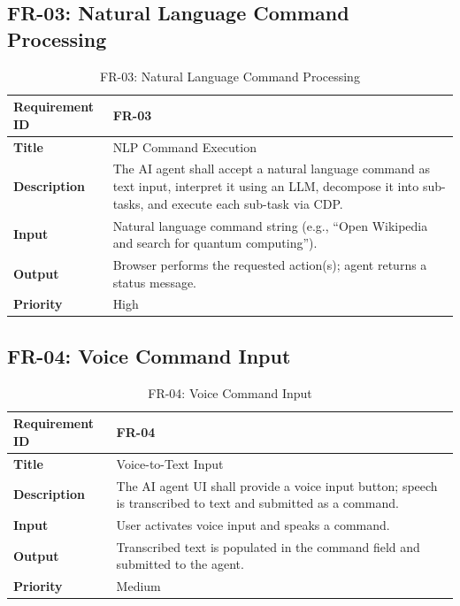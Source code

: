\subsection{FR-03: Natural Language Command Processing}
\begin{table}[H]
\centering
\caption{FR-03: Natural Language Command Processing}
\begin{tabular}{|p{4cm}|p{10cm}|}
\hline
\textbf{Requirement ID} & FR-03 \\ \hline
\textbf{Title} & NLP Command Execution \\ \hline
\textbf{Description} & The AI agent shall accept a natural language command as text input, interpret it using an LLM, decompose it into sub-tasks, and execute each sub-task via CDP. \\ \hline
\textbf{Input} & Natural language command string (e.g., ``Open Wikipedia and search for quantum computing''). \\ \hline
\textbf{Output} & Browser performs the requested action(s); agent returns a status message. \\ \hline
\textbf{Priority} & High \\ \hline
\end{tabular}
\end{table}

\needspace{7cm}
\subsection{FR-04: Voice Command Input}
\begin{table}[H]
\centering
\caption{FR-04: Voice Command Input}
\begin{tabular}{|p{4cm}|p{10cm}|}
\hline
\textbf{Requirement ID} & FR-04 \\ \hline
\textbf{Title} & Voice-to-Text Input \\ \hline
\textbf{Description} & The AI agent UI shall provide a voice input button; speech is transcribed to text and submitted as a command. \\ \hline
\textbf{Input} & User activates voice input and speaks a command. \\ \hline
\textbf{Output} & Transcribed text is populated in the command field and submitted to the agent. \\ \hline
\textbf{Priority} & Medium \\ \hline
\end{tabular}
\end{table}

\needspace{7cm}

